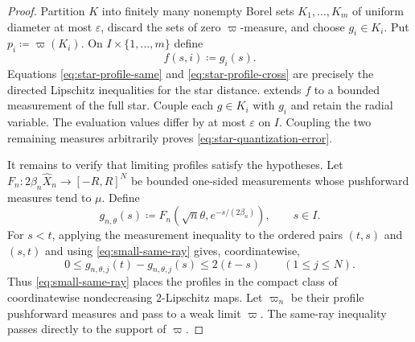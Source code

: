 \documentclass{amsart}
\numberwithin{equation}{section}
\theoremstyle{plain}
\theoremstyle{definition}
\theoremstyle{remark}
\newcommand{\eps}{\varepsilon}
\begin{document}
\begin{proof}
Partition $K$ into finitely many nonempty Borel sets $K_1,\ldots,K_m$ of uniform diameter at most $\eps$, discard the sets of zero $\varpi$-measure, and choose $g_i\in K_i$.  Put $p_i\coloneqq\varpi(K_i)$.  On $I\times\{1,\ldots,m\}$ define
\[ f(s,i)\coloneqq g_i(s). \]
Equations \eqref{eq:star-profile-same} and \eqref{eq:star-profile-cross} are precisely the directed Lipschitz inequalities for the star distance.   extends $f$ to a bounded measurement of the full star.  Couple each $g\in K_i$ with $g_i$ and retain the radial variable.  The evaluation values differ by at most $\eps$ on $I$.  Coupling the two remaining measures arbitrarily proves \eqref{eq:star-quantization-error}.

It remains to verify that limiting profiles satisfy the hypotheses.  Let $F_n\colon2\beta_n\widehat X_n\to[-R,R]^N$ be bounded one-sided measurements whose pushforward measures tend to $\mu$.  Define
\[ g_{n,\theta}(s) \coloneqq F_n(\sqrt n\theta,e^{-s/(2\beta_n)}), \qquad s\in I. \]
For $s<t$, applying the measurement inequality to the ordered pairs $(t,s)$ and $(s,t)$ and using \eqref{eq:small-same-ray} gives, coordinatewise,
\[ 0\le g_{n,\theta,j}(t)-g_{n,\theta,j}(s)\le2(t-s) \qquad(1\le j\le N). \]
Thus \eqref{eq:small-same-ray} places the profiles in the compact class of coordinatewise nondecreasing $2$-Lipschitz maps.  Let $\varpi_n$ be their profile pushforward measures and pass to a weak limit $\varpi$.  The same-ray inequality passes directly to the support of $\varpi$.


\end{proof}
\end{document}
